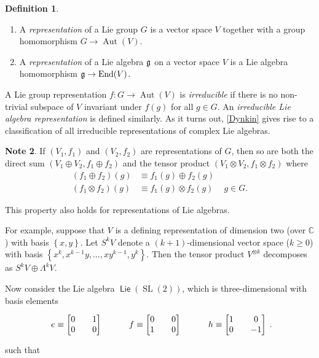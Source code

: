 \documentclass[10pt,letterpaper,cm]{nupset}
\theoremstyle{definition}
\newtheorem{defn}{Definition}[subsection]
\newtheorem{note}[defn]{Note}
\theoremstyle{theorem}
\theoremstyle{remark}
\newcommand{\C}{\mathbb C}
\newcommand{\1}{\mathbb{1}}
\newcommand{\0}{\vec 0}
\DeclareMathOperator{\SL}{SL}
\DeclareMathOperator{\aut}{Aut}
\DeclareMathOperator{\ed}{End}
\DeclareMathOperator{\lie}{\mathsf{Lie}}
\newcommand{\be}{\begin{enumerate}}
\newcommand{\ee}{\end{enumerate}}
\begin{document}
\smallskip

\begin{defn} $ $
\be
\item A \textit{representation} of a Lie group $G$ is a vector space $V$ together with a group homomorphism \linebreak $G\to \aut(V)$.
\item A \textit{representation} of a Lie algebra $\frak{g}$ on a vector space $V$ is a Lie algebra homomorphism $\frak{g} \to \ed(V)$.
\ee
\end{defn}

A Lie group representation $f: G \to \aut(V)$  is \textit{irreducible} if there is no non-trivial subspace of $V$ invariant under $f(g)$ for all $g\in G$. An \textit{irreducible Lie algebra representation}  is defined similarly. As it turns out, \cref{Dynkin} gives rise to a classification of all irreducible representations of complex Lie algebras.

\begin{note}
If $\left(V_1, f_1\right)$ and $\left(V_2, f_2\right)$ are representations of $G$, then so are both the direct sum $\left(V_1 \oplus V_2, f_1\oplus f_2\right)$  and the tensor product $\left(V_1 \otimes V_2, f_1\otimes f_2\right)$ where 
\begin{align*}
\left(f_1\oplus f_2\right)(g) & \equiv f_1(g) \oplus f_2(g)
\\ \left(f_1\otimes f_2\right)(g) & \equiv f_1(g) \otimes f_2(g) \ \quad  g\in G.
\end{align*}

\smallskip

This property also holds for representations of Lie algebras.
\end{note}


For example, suppose that $V$ is a defining representation of dimension two (over $\C$) with basis $\left\{x,y\right\}$. Let $S^k{V}$ denote a $\left(k+1\right)$-dimensional vector space ($k\geq 0$) with basis $\left\{x^k, x^{k-1}y, \ldots, xy^{k-1}, y^k\right\}$. Then the tensor product $V^{\otimes{k}}$ decomposes as $S^k{V} \oplus \Lambda^k{V}$.

\medskip

Now consider the Lie algebra $\lie(\SL(2))$, which is three-dimensional with basis elements
\[
\begin{tikzcd}
e\equiv \begin{bmatrix} 0 & 1 \\ 0 & 0 \end{bmatrix} & f\equiv \begin{bmatrix} 0 & 0 \\ 1 & 0 \end{bmatrix} & h\equiv \begin{bmatrix} 1 & 0 \\ 0 & {-1} \end{bmatrix}
\end{tikzcd}.
\] such that 
\end{document}

